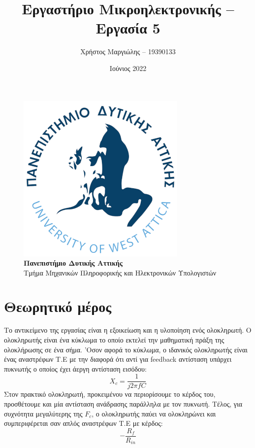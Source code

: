 \documentclass[12pt]{article}
\title{Εργαστήριο Μικροηλεκτρονικής -- Εργασία 5}
\author{Χρήστος Μαργιώλης -- 19390133}
\date{Ιούνιος 2022}
\begin{document}
\begin{titlepage}
        \maketitle
        \begin{figure}[t!]
        \begin{center}
        \includegraphics[scale=0.3]{./res/uniwalogo.png} \\
        \Large
        \textbf{Πανεπιστήμιο Δυτικής Αττικής} \\
        \large
        Τμήμα Μηχανικών Πληροφορικής και Ηλεκτρονικών Υπολογιστών
        \end{center}
        \end{figure}
\end{titlepage}

\renewcommand{\contentsname}{Περιεχόμενα}
\tableofcontents
\pagebreak

\section{Θεωρητικό μέρος}

Το αντικείμενο της εργασίας είναι η εξοικείωση και η υλοποίηση ενός ολοκληρωτή.
Ο ολοκληρωτής είναι ένα κύκλωμα το οποίο εκτελεί την μαθηματική πράξη της
ολοκλήρωσης σε ένα σήμα. 'Οσον αφορά το κύκλωμα, ο ιδανικός ολοκληρωτής είναι
ένας αναστρέφων Τ.Ε με την διαφορά ότι αντί για feedback αντίσταση υπάρχει
πυκνωτής ο οποίος έχει άεργη αντίσταση εισόδου:
\[X_c = \frac{1}{j2\pi fC}\]
Στον πρακτικό ολοκληρωτή, προκειμένου να περιορίσουμε το κέρδος του,
προσθέτουμε και μία αντίσταση ανάδρασης παράλληλα με τον πυκνωτή. Τέλος, για
συχνότητα μεγαλύτερης της $F_c$, ο ολοκληρωτής παύει να ολοκληρώνει και
συμπεριφέρεται σαν απλός αναστρέφων Τ.Ε με κέρδος:
\[-\frac{R_f}{R_{in}}\]
\end{document}
